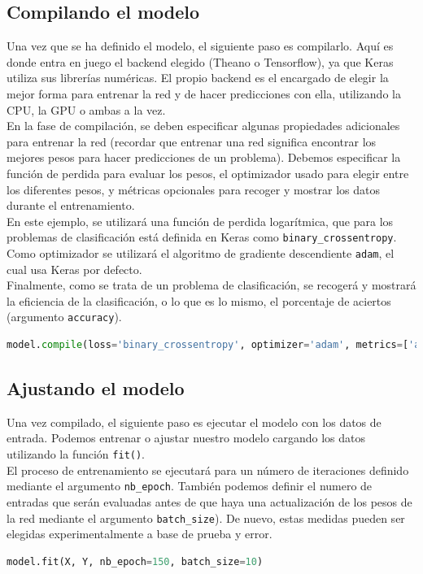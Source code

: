 \subsection{Compilando el modelo}
Una vez que se ha definido el modelo, el siguiente paso es compilarlo. Aquí es donde entra en juego el backend elegido (Theano o Tensorflow), ya que Keras utiliza sus librerías numéricas. El propio backend es el encargado de elegir la mejor forma para entrenar la red y de hacer predicciones con ella, utilizando la CPU, la GPU o ambas a la vez.\\
En la fase de compilación, se deben especificar algunas propiedades adicionales para entrenar la red (recordar que entrenar una red significa encontrar los mejores pesos para hacer predicciones de un problema). Debemos especificar la función de perdida para evaluar los pesos, el optimizador usado para elegir entre los diferentes pesos, y métricas opcionales para recoger y mostrar los datos durante el entrenamiento.\\
En este ejemplo, se utilizará una función de perdida logarítmica, que para los problemas de clasificación está definida en Keras como \lstinline{binary_crossentropy}. Como optimizador se utilizará el algoritmo de gradiente descendiente \lstinline{adam}, el cual usa Keras por defecto.\\
Finalmente, como se trata de un problema de clasificación, se recogerá y mostrará la eficiencia de la clasificación, o lo que es lo mismo, el porcentaje de aciertos (argumento \lstinline{accuracy}).

\begin{lstlisting}[language=Python]
model.compile(loss='binary_crossentropy', optimizer='adam', metrics=['accuracy'])
\end{lstlisting}

\subsection{Ajustando el modelo}
Una vez compilado, el siguiente paso es ejecutar el modelo con los datos de entrada. Podemos entrenar o ajustar nuestro modelo cargando los datos utilizando la función \lstinline{fit()}.\\
El proceso de entrenamiento se ejecutará para un número de iteraciones definido mediante el argumento \lstinline{nb_epoch}. También podemos definir el numero de entradas que serán evaluadas antes de que haya una actualización de los pesos de la red mediante el argumento \lstinline{batch_size}). De nuevo, estas medidas pueden ser elegidas experimentalmente a base de prueba y error.
\begin{lstlisting}[language=Python]
model.fit(X, Y, nb_epoch=150, batch_size=10)
\end{lstlisting}

